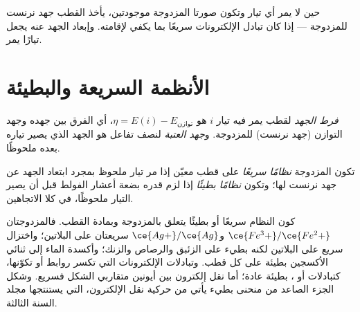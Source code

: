 حين لا يمر أي تيار وتكون صورتا المزدوجة موجودتين، يأخذ القطب
جهد نرنست للمزدوجة --- إذا كان تبادل الإلكترونات سريعًا بما يكفي
لإقامته. وإبعاد الجهد عنه يجعل تيارًا
يمر.

\section{الأنظمة السريعة والبطيئة}

\begin{definition}\label{def:b2:current-potential-curves:overpotential}
\emph{فرط الجهد} لقطب يمر فيه
تيار $i$ هو $\eta = E(i) - E_{\text{توازن}}$، أي الفرق بين
جهده وجهد التوازن (جهد نرنست) للمزدوجة. و\emph{جهد
العتبة} لنصف تفاعل هو
الجهد الذي يصير تياره بعده ملحوظًا.
\end{definition}

\begin{definition}\label{def:b2:current-potential-curves:fast-slow}
تكون المزدوجة \emph{نظامًا سريعًا} على قطب معيّن إذا
مر تيار ملحوظ بمجرد ابتعاد الجهد عن جهد
نرنست لها؛ وتكون \emph{نظامًا بطيئًا} إذا لزم 
قدره بضعة أعشار الفولط قبل أن يصير التيار ملحوظًا، في
كلا الاتجاهين.
\end{definition}

كون النظام سريعًا أو بطيئًا يتعلق بالمزدوجة وبمادة
القطب. فالمزدوجتان $\ce{Fe^3+}/\ce{Fe^2+}$ و$\ce{Ag+}/\ce{Ag}$ سريعتان على
البلاتين؛ واختزال  سريع على البلاتين لكنه بطيء على الزئبق
والرصاص والزنك؛ وأكسدة الماء إلى ثنائي الأكسجين بطيئة على كل قطب.
وتبادلات الإلكترونات التي تكسر روابط أو تكوّنها، كتبادلات  أو ،
بطيئة عادة؛ أما نقل إلكترون بين أيونين متقاربي
الشكل فسريع. وشكل الجزء الصاعد من منحنى بطيء يأتي من
حركية نقل الإلكترون، التي يستنتجها مجلد السنة الثالثة.

